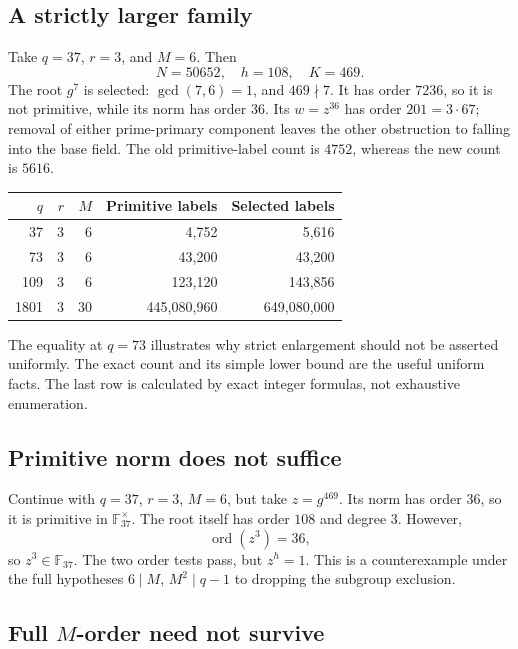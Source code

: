 \documentclass[11pt,a4paper]{article}
\theoremstyle{definition}
\theoremstyle{remark}
\newcommand{\F}{\mathbb F}
\newcommand{\ord}{\operatorname{ord}}
\begin{document}
\subsection{A strictly larger family}

Take \(q=37\), \(r=3\), and \(M=6\). Then
\[
       N=50652,\quad h=108,\quad K=469.
\]
The root \(g^7\) is selected: \(\gcd(7,6)=1\), and \(469\nmid7\).
It has order \(7236\), so it is not primitive, while its norm has order \(36\).
Its \(w=z^{36}\) has order \(201=3\cdot67\); removal of either prime-primary
component leaves the other obstruction to falling into the base field.
The old primitive-label count is \(4752\), whereas the new count is \(5616\).

\begin{center}
\begin{tabular}{@{}rrrrr@{}}
\toprule
\(q\) & \(r\) & \(M\) & Primitive labels & Selected labels\\
\midrule
37 & 3 & 6 & 4,752 & 5,616\\
73 & 3 & 6 & 43,200 & 43,200\\
109 & 3 & 6 & 123,120 & 143,856\\
1801 & 3 & 30 & 445,080,960 & 649,080,000\\
\bottomrule
\end{tabular}
\end{center}

The equality at \(q=73\) illustrates why strict enlargement should not be asserted
uniformly. The exact count and its simple lower bound are the useful uniform facts.
The last row is calculated by exact integer formulas, not exhaustive enumeration.

\subsection{Primitive norm does not suffice}

Continue with \(q=37\), \(r=3\), \(M=6\), but take \(z=g^{469}\).
Its norm has order \(36\), so it is primitive in \(\F_{37}^{\times}\).
The root itself has order \(108\) and degree \(3\). However,
\[
                        \ord(z^3)=36,
\]
so \(z^3\in\F_{37}\). The two order tests pass, but \(z^h=1\).
This is a counterexample under the full hypotheses \(6\mid M\), \(M^2\mid q-1\)
to dropping the subgroup exclusion.

\subsection{Full \texorpdfstring{\(M\)}{M}-order need not survive}
\end{document}
